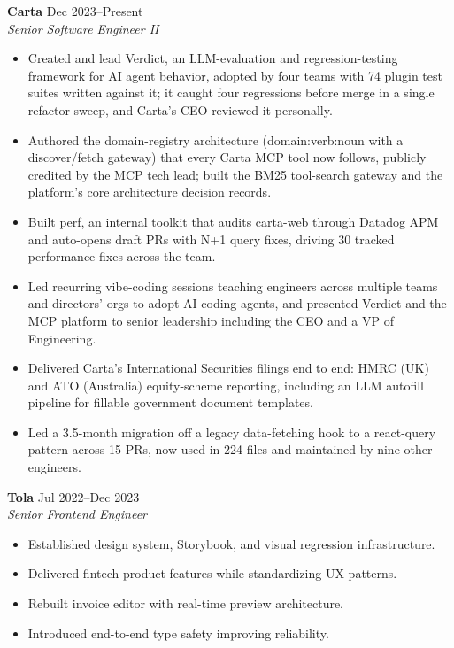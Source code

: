 \documentclass[11pt]{article}
\begin{document}
\textbf{Carta} \hfill Dec 2023--Present\\
\textit{Senior Software Engineer II}
\begin{itemize}
    \item Created and lead Verdict, an LLM-evaluation and regression-testing framework for AI agent behavior, adopted by four teams with 74 plugin test suites written against it; it caught four regressions before merge in a single refactor sweep, and Carta's CEO reviewed it personally.
    \item Authored the domain-registry architecture (domain:verb:noun with a discover/fetch gateway) that every Carta MCP tool now follows, publicly credited by the MCP tech lead; built the BM25 tool-search gateway and the platform's core architecture decision records.
    \item Built perf, an internal toolkit that audits carta-web through Datadog APM and auto-opens draft PRs with N+1 query fixes, driving 30 tracked performance fixes across the team.
    \item Led recurring vibe-coding sessions teaching engineers across multiple teams and directors' orgs to adopt AI coding agents, and presented Verdict and the MCP platform to senior leadership including the CEO and a VP of Engineering.
    \item Delivered Carta's International Securities filings end to end: HMRC (UK) and ATO (Australia) equity-scheme reporting, including an LLM autofill pipeline for fillable government document templates.
    \item Led a 3.5-month migration off a legacy data-fetching hook to a react-query pattern across 15 PRs, now used in 224 files and maintained by nine other engineers.
\end{itemize}

\textbf{Tola} \hfill Jul 2022--Dec 2023\\
\textit{Senior Frontend Engineer}
\begin{itemize}
    \item Established design system, Storybook, and visual regression infrastructure.
    \item Delivered fintech product features while standardizing UX patterns.
    \item Rebuilt invoice editor with real-time preview architecture.
    \item Introduced end-to-end type safety improving reliability.
\end{itemize}
\end{document}
